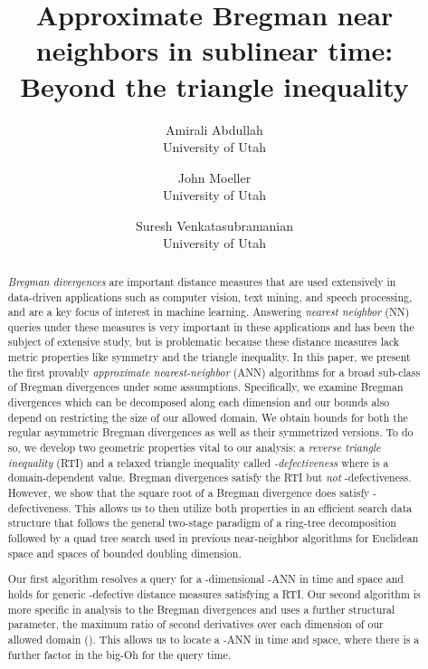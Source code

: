 \documentclass[11pt]{myclass}
\title{Approximate Bregman near neighbors in sublinear time: Beyond the triangle inequality}
\author{Amirali Abdullah\\University of Utah \and John Moeller\\University of Utah \and Suresh Venkatasubramanian\\University of Utah}
\date{}
\begin{document}
\begin{titlepage}
\maketitle
\thispagestyle{empty}
\begin{abstract}
\emph{Bregman divergences} are  important distance measures that are used extensively in data-driven applications such as computer vision, text mining, and speech processing, and are a key focus of interest in machine learning. Answering \emph{nearest neighbor} (NN) queries under these measures is very important in these applications and has been the subject of extensive study, but is problematic because these distance measures  lack metric properties like symmetry and the triangle inequality.
In this paper, we present the first provably  \emph{approximate nearest-neighbor} (ANN)  algorithms for a broad sub-class of Bregman divergences under some assumptions. Specifically, we examine Bregman divergences which can be decomposed along each dimension and our bounds also depend on restricting the size of our allowed domain. We obtain bounds for both the regular asymmetric Bregman divergences as well as their symmetrized versions. 
To do so, we develop two geometric properties vital to our analysis: a \emph{reverse triangle inequality} 
(RTI) and a relaxed triangle inequality called \emph{-defectiveness} where  is a domain-dependent value. 
Bregman divergences  satisfy the RTI but \emph{not} -defectiveness. However, we show that the square root of a 
Bregman divergence does satisfy -defectiveness. This allows us to then utilize both properties in
 an efficient search data structure that follows the general two-stage paradigm of a ring-tree 
decomposition followed by a quad tree search used in previous near-neighbor algorithms for Euclidean space and spaces of bounded doubling dimension. 


Our first algorithm resolves a query for a -dimensional -ANN in  time and  space and holds for generic -defective distance measures satisfying a RTI. 
Our second algorithm is more specific in analysis to the Bregman divergences and uses a further structural parameter, the maximum ratio of second derivatives over each dimension of our allowed domain (). This allows us to locate a -ANN in  time and  space, where there is a further  factor in the big-Oh for the query time.

\end{abstract}  
\end{titlepage}
\end{document}
